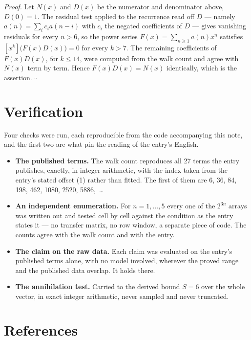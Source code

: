 \documentclass[11pt]{article}
\theoremstyle{definition}
\begin{document}
{\itshape Proof.} Let $N(x)$ and $D(x)$ be the numerator and denominator above, $D(0)=1$. The residual test applied to the recurrence read off $D$ --- namely $a(n) = \sum_i c_i a(n-i)$ with $c_i$ the negated coefficients of $D$ --- gives vanishing residuals for every $n > 6$, so the power series $F(x)=\sum_{n\ge 1}a(n)x^n$ satisfies $[x^k]\bigl(F(x)D(x)\bigr) = 0$ for every $k > 7$. The remaining coefficients of $F(x)D(x)$, for $k \le 14$, were computed from the walk count and agree with $N(x)$ term by term. Hence $F(x)D(x) = N(x)$ identically, which is the assertion. $\square$

\section{Verification}

Four checks were run, each reproducible from the code accompanying this note, and the first two are what pin the reading of the entry's English.

\begin{itemize}

\item {\bfseries The published terms.} The walk count reproduces all 27 terms the entry publishes, exactly, in integer arithmetic, with the index taken from the entry's stated offset (1) rather than fitted. The first of them are 6, 36, 84, 198, 462, 1080, 2520, 5886,~\dots

\item {\bfseries An independent enumeration.} For $n = 1,\dots,5$ every one of the $2^{3n}$ arrays was written out and tested cell by cell against the condition as the entry states it --- no transfer matrix, no row window, a separate piece of code. The counts agree with the walk count and with the entry.

\item {\bfseries The claim on the raw data.} Each claim was evaluated on the entry's published terms alone, with no model involved, wherever the proved range and the published data overlap. It holds there.

\item {\bfseries The annihilation test.} Carried to the derived bound $S = 6$ over the whole vector, in exact integer arithmetic, never sampled and never truncated.

\end{itemize}

\section{References}
\end{document}
